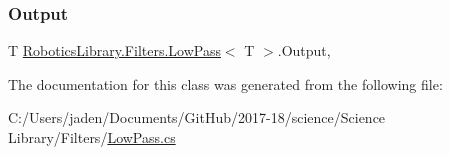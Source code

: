 \mbox{\label{class_robotics_library_1_1_filters_1_1_low_pass_a83f66e4bfd6737c56614f3bb9a73876f}} 
\subsubsection{\texorpdfstring{Output}{Output}}
{\footnotesize\ttfamily T \hyperlink{class_robotics_library_1_1_filters_1_1_low_pass}{Robotics\+Library.\+Filters.\+Low\+Pass}$<$ T $>$.Output\hspace{0.3cm}{\ttfamily [get]}, {}}



The documentation for this class was generated from the following file\+:\begin{DoxyCompactItemize}
\item 
C\+:/\+Users/jaden/\+Documents/\+Git\+Hub/2017-\/18/science/\+Science Library/\+Filters/\hyperlink{_low_pass_8cs}{Low\+Pass.\+cs}\end{DoxyCompactItemize}
